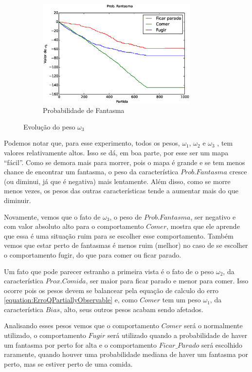 \begin{figure}[H]
	\centering
	\begin{subfigure}[t]{.5\textwidth}
		\centering
		\includegraphics[width=80mm]{images/3_behaviors_original_map/weights____pol__ProbFantasma}
		\caption{Probabilidade de Fantasma}
	\end{subfigure}
	\caption{Evolução do peso $ \omega_3 $}
	\label{img:3ComportamentosMapaOriginal:PesoProbFantasma}
\end{figure}

Podemos notar que, para esse experimento, todos os pesos, $ \omega_1 $, $ \omega_2 $ e $ \omega_3 $ , tem valores relativamente altos. Isso se dá, em boa parte, por esse ser um mapa ``fácil''. Como se demora mais para morrer, pois o mapa é grande e se tem menos chance de encontrar um fantasma, o peso da característica $ Prob. Fantasma $ cresce (ou diminui, já que é negativa) mais lentamente. Além disso, como se morre menos vezes, os pesos das outras características tende a aumentar mais do que diminuir.

Novamente, vemos que o fato de $ \omega_3 $, o peso de $ Prob.Fantasma $, ser negativo e com valor absoluto alto para o comportamento $ Comer $, mostra que ele aprende que essa é uma situação ruim para se escolher esse comportamento. Também vemos que estar perto de fantasmas é menos ruim (melhor) no caso de se escolher o comportamento fugir, do que para comer ou ficar parado.

Um fato que pode parecer estranho a primeira vista é o fato de o peso $ \omega_2 $, da característica $ Prox. Comida $, ser maior para ficar parado e menor para comer. Isso ocorre pois os pesos devem se balancear pela equação de calculo do erro \ref{equation:ErroQPartiallyObservable} e, como $ Comer $ tem um peso $ \omega_1 $, da característica $ Bias $, alto, seus outros pesos acabam sendo afetados.

Analisando esses pesos vemos que o comportamento $ Comer $ será o normalmente utilizado, o comportamento $ Fugir $ será utilizado quando a probabilidade de haver um fantasma por perto for alta e o comportamento $ Ficar\_Parado $ será escolhido raramente, quando houver uma probabilidade mediana de haver um fantasma por perto, mas se estiver perto de uma comida.

